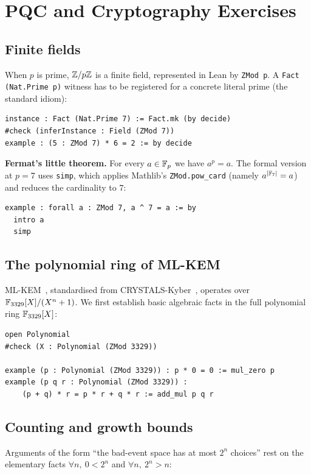 \section{PQC and Cryptography Exercises}\label{sec:pqc}

\subsection{Finite fields}
When $p$ is prime, $\mathbb{Z}/p\mathbb{Z}$ is a finite field, represented in Lean by
\texttt{ZMod p}. A \texttt{Fact (Nat.Prime p)} witness has to be registered
for a concrete literal prime (the standard idiom):

\begin{lstlisting}
instance : Fact (Nat.Prime 7) := Fact.mk (by decide)
#check (inferInstance : Field (ZMod 7))
example : (5 : ZMod 7) * 6 = 2 := by decide
\end{lstlisting}

\noindent\textbf{Fermat's little theorem.} For every $a\in\mathbb{F}_{p}$ we have
$a^p = a$. The formal version at $p=7$ uses \texttt{simp}, which applies
Mathlib's \texttt{ZMod.pow\_card} (namely $a^{|\mathbb{F}_{7}|}=a$) and reduces the
cardinality to $7$:

\begin{lstlisting}
example : forall a : ZMod 7, a ^ 7 = a := by
  intro a
  simp
\end{lstlisting}

\subsection{The polynomial ring of ML-KEM}
ML-KEM~\cite{FIPS203}, standardised from CRYSTALS-Kyber~\cite{BDKLLPSSS2018Kyber},
operates over $\mathbb{F}_{3329}[X]/(X^n+1)$. We first establish basic algebraic
facts in the full polynomial ring $\mathbb{F}_{3329}[X]$:

\begin{lstlisting}
open Polynomial
#check (X : Polynomial (ZMod 3329))

example (p : Polynomial (ZMod 3329)) : p * 0 = 0 := mul_zero p
example (p q r : Polynomial (ZMod 3329)) :
    (p + q) * r = p * r + q * r := add_mul p q r
\end{lstlisting}

\subsection{Counting and growth bounds}
Arguments of the form ``the bad-event space has at most $2^n$ choices'' rest
on the elementary facts $\forall n,\ 0 < 2^n$ and $\forall n,\ 2^n > n$:

